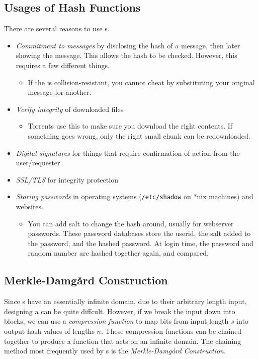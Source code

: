 \subsection{Usages of Hash Functions}\label{subsec:Hash_Functions_Usages}
There are several reasons to use s.
\begin{itemize}[noitemsep]
\item \emph{Commitment to messages} by disclosing the hash of a message, then later showing the message. This allows the hash to be checked. However, this requires a few different things.
  \begin{itemize}[noitemsep]
  \item If the  is collision-resistant, you cannot cheat by substituting your original message for another.
  \end{itemize}
\item \emph{Verify integrity} of downloaded files
  \begin{itemize}[noitemsep]
  \item Torrents use this to make sure you download the right contents. If something goes wrong, only the right small chunk can be redownloaded.
  \end{itemize}
\item \emph{Digital signatures} for things that require confirmation of action from the user/requester.
\item \emph{SSL/TLS} for integrity protection
\item \emph{Storing passwords} in operating systems (\texttt{/etc/shadow} on *nix machines) and websites.
  \begin{itemize}[noitemsep]
  \item You can add salt to change the hash around, usually for webserver passwords. These password databases store the userid, the salt added to the password, and the hashed password. At login time, the password and random number are hashed together again, and compared.
  \end{itemize}
\end{itemize}

\subsection{Merkle-Damg\r{a}rd Construction}\label{subsec:Merkle_Damgard_Construction}
\begin{definition}\label{def:Merkle_Damgard_Construction}
  Since s have an essentially infinite domain, due to their arbitrary length input, designing a  can be quite diffcult.
  However, if we break the input down into blocks, we can use a \emph{compression function} to map bits from input length $s$ into output hash values of lengths $n$.
  These compression functions can be chained together to produce a function that acts on an infinite domain.
  The chaining method most frequently used by s is the \emph{Merkle-Damg\r{a}rd Construction}.
\end{definition}

